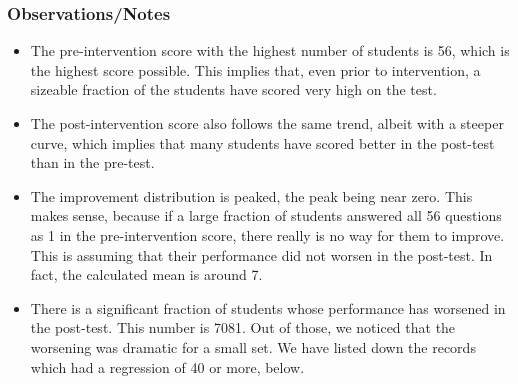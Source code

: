 \documentclass[10pt]{article}
\begin{document}
\subsubsection{Observations/Notes}
\label{sec:ObservationsShapeOfData}
\begin{itemize}
\item The pre-intervention score with the highest number of students is 56, which is the highest score possible. This implies that, even prior to intervention, a sizeable fraction of the students have scored very high on the test.
\item The post-intervention score also follows the same trend, albeit with a steeper curve, which implies that many students have scored better in the post-test than in the pre-test.
\item The improvement distribution is peaked, the peak being near zero. This makes sense, because if a large fraction of students answered all 56 questions as 1 in the pre-intervention score, there really is no way for them to improve. This is assuming that their performance did not worsen in the post-test. In fact, the calculated mean is around 7.
\item There is a significant fraction of students whose performance has worsened in the post-test. This number is 7081. Out of those, we noticed that the worsening was dramatic for a small set. We have listed down the records which had a regression of 40 or more, below.


\end{itemize}
\end{document}
